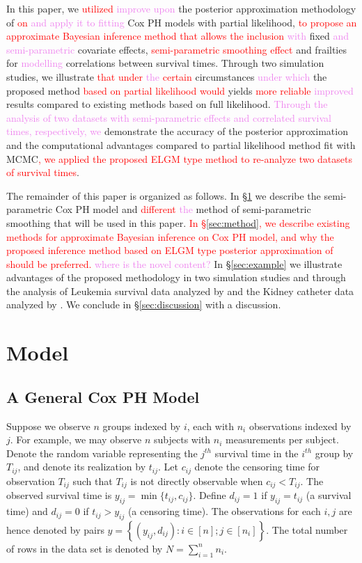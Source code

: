 \documentclass[ba]{imsart}
\newcommand{\highlight}[1]{\textcolor{red}{#1}}
\newcommand{\alex}[1]{\textcolor{violet}{{ }#1}}
\begin{document}
In this paper, we \highlight{utilized}\alex{improve upon} the posterior approximation methodology of \highlight{\cite{ELGM}}{\alex{\cite{casecross}}} \highlight{on}\alex{and apply it to fitting} Cox PH models with partial likelihood, \highlight{to propose an approximate Bayesian inference method that allows the inclusion}\alex{with} fixed\alex{and semi-parametric} covariate effects, \highlight{semi-parametric smoothing effect} and frailties for\alex{modelling} correlations between survival times. Through two simulation studies, we illustrate \highlight{that under}\alex{the} \highlight{certain} circumstances\alex{under which} the proposed method \highlight{based on partial likelihood would} yields \highlight{more reliable}\alex{improved} results compared to existing methods based on full likelihood.\alex{Through the analysis of two datasets with semi-parametric effects and correlated survival times, respectively, we} demonstrate the accuracy of the posterior approximation and the computational advantages compared to partial likelihood method fit with MCMC\highlight{, we applied the proposed ELGM type method to re-analyze two datasets of survival times}.

The remainder of this paper is organized as follows. In \S\ref{sec:model} we describe the semi-parametric Cox PH model and \highlight{different}\alex{the} method of semi-parametric smoothing that will be used in this paper. \highlight{In \S\ref{sec:method}, we describe existing methods for approximate Bayesian inference on Cox PH model, and why the proposed inference method based on ELGM type posterior approximation of \cite{ELGM} should be preferred.}\alex{where is the novel content?} In \S\ref{sec:example} we illustrate advantages of the proposed methodology in two simulation studies and through the analysis of Leukemia survival data analyzed by \cite{inlacoxph} and the Kidney catheter data analyzed by \cite{kidney}. We conclude in \S\ref{sec:discussion} with a discussion.

\section{Model}\label{sec:model}

\subsection{A General Cox PH Model}

Suppose we observe $n$ groups indexed by $i$, each with $n_{i}$ observations indexed by $j$. For example, we may observe $n$ subjects with $n_{i}$ measurements per subject. Denote the random variable representing the $j^{th}$ survival time in the $i^{th}$ group by $T_{ij}$, and denote its realization by $t_{ij}$. Let $c_{ij}$ denote the censoring time for observation $T_{ij}$ such that $T_{ij}$ is not directly observable when $c_{ij} < T_{ij}$. The observed survival time is $y_{ij} = \min\{t_{ij},c_{ij}\}$. Define $d_{ij} = 1$ if $y_{ij} = t_{ij}$ (a survival time) and $d_{ij} = 0$ if $t_{ij} > y_{ij}$ (a censoring time). The observations for each $i,j$ are hence denoted by pairs $y =  \left\{(y_{ij},d_{ij}): i\in[n]; j\in[n_{i}] \right\}$. The total number of rows in the data set is denoted by $N = \sum_{i=1}^{n}n_{i}$.
\end{document}
